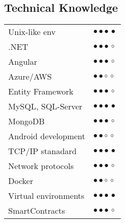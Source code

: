 \documentclass[a4paper,10pt]{article}
\newcommand{\SkillBull}[1]{%
\textcolor{ColorTwo}{#1}
}
\begin{document}
\begin{adjustbox}{valign=t}
\begin{minipage}{0.6\textwidth}
\begin{multicols}{2}
\section*{Technical Knowledge}
\begin{tabular}{ll}
    Unix-like env	    & \SkillBull{$\bullet \bullet \bullet \, \bullet$}\\
	.NET		& \SkillBull{$\bullet \bullet \bullet \, \circ$}\\
	Angular  	& \SkillBull{$\bullet \bullet \bullet \, \circ$}\\
	Azure/AWS		& \SkillBull{$\bullet \bullet \circ \, \circ$}\\
	Entity Framework 	& \SkillBull{$\bullet \bullet \bullet \, \circ$}\\
	MySQL, SQL-Server   & \SkillBull{$\bullet \bullet \bullet \, \bullet$}\\
	MongoDB   	    & \SkillBull{$\bullet \bullet \bullet \, \circ$}\\
	Android development   	    & \SkillBull{$\bullet \bullet \circ \, \circ$}\\
	TCP/IP stanadard	    & \SkillBull{$\bullet \bullet \bullet \, \bullet$}\\
	Network protocols	    & \SkillBull{$\bullet \bullet \bullet \, \circ$}\\
	Docker	    & \SkillBull{$\bullet \bullet \circ \, \circ$}\\
	Virtual environments	    & \SkillBull{$\bullet \bullet \bullet \, \bullet$}\\
	SmartContracts & \SkillBull{$\bullet \bullet \bullet \, \circ$}\\
\end{tabular}
\end{multicols}
\end{minipage}
\end{adjustbox}

\newpage
\thispagestyle{empty}
\end{document}
